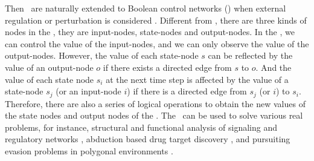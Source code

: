 Then \BNs\ are naturally extended to Boolean control networks (\BCNs) when external regulation or perturbation is considered \cite{Ideker2001A}. Different from \BNs, there are three kinds of nodes in the \BCNs, they are input-nodes, state-nodes and output-nodes. In the \BCNs, we can control the value of the input-nodes, and we can only observe the value of the output-nodes. However, the value of each state-node $s$ can be reflected by the value of an output-node $o$ if there exists a directed edge from $s$ to $o$. And the value of each state node $s_i$ at the next time step is affected by the value of a state-node $s_j$ (or an input-node $i$) if there is a directed edge from $s_j$ (or $i$) to $s_i$. Therefore, there are also a series of logical operations to obtain the new values of the state nodes and output nodes of the \BCNs. The \BCNs\ can be used to solve various real problems, for instance, %
structural and functional analysis of signaling and regulatory networks \cite{Kaufman1999A, Klamt2006A}, 
abduction based drug target discovery \cite{Biane2017Abduction}, %
and pursuiting evasion problems in polygonal environments \cite{Thunberg2011A}. %
